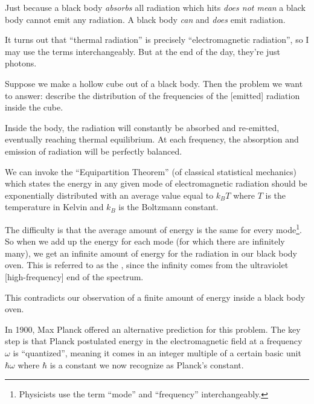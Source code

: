 \begin{remark}
Just because a black body \emph{absorbs} all radiation which hits
\emph{does not mean} a black body cannot emit any radiation. A black
body \emph{can} and \emph{does} emit radiation.
\end{remark}

\begin{remark}
It turns out that ``thermal radiation'' is precisely ``electromagnetic radiation'',
so I may use the terms interchangeably. But at the end of the day,
they're just photons.
\end{remark}

Suppose we make a hollow cube out of a black body. Then the problem we
want to answer: describe the distribution of the frequencies of the
[emitted] radiation inside the cube.

Inside the body, the radiation will constantly be absorbed and re-emitted,
eventually reaching thermal equilibrium.
At each frequency, the absorption and emission of radiation will be
perfectly balanced.

We can invoke the ``Equipartition Theorem'' (of classical statistical
mechanics) which states the energy in any given mode of electromagnetic
radiation should be exponentially distributed with an average value
equal to $k_{B}T$ where $T$ is the temperature in Kelvin and $k_{B}$ is
the Boltzmann constant.

The difficulty is that the average amount of energy is the same for
every mode\footnote{Physicists use the term ``mode'' and ``frequency''
interchangeably.}. So when we add up the energy for each mode (for which
there are infinitely many), we get an infinite amount of energy for the
radiation in our black body oven. This is referred to as the
, since the infinity comes from the
ultraviolet [high-frequency] end of the spectrum.

This contradicts our observation of a finite amount of energy inside a
black body oven.

In 1900, Max Planck offered an alternative prediction for this problem. The
key step is that Planck postulated energy in the electromagnetic field
at a frequency $\omega$ is ``quantized'', meaning it comes in an integer
multiple of a certain basic unit $\hbar\omega$ where $\hbar$ is a
constant we now recognize as Planck's constant.


